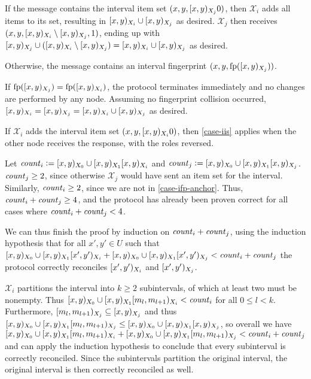 \begin{caselist}
 \label{case-iis}  If the message contains the interval item set $({x}, {y}, [{x},{y})_{X_j}{0})$, then $\mathcal{X}_i$ adds all items to its set, resulting in $[{x},{y})_{X_i} \cup [{x},{y})_{X_j}$ as desired. $\mathcal{X}_j$ then receives $({x}, {y}, {[{x},{y})_{X_i} \setminus [{x},{y})_{X_j}}, {1})$, ending up with $[{x},{y})_{X_j} \cup ([{x},{y})_{X_i} \setminus [{x},{y})_{X_j}) = [{x},{y})_{X_i} \cup [{x},{y})_{X_j}$ as desired.

 \label{case-ifp} Otherwise, the message contains an interval fingerprint $({x}, {y}, {\operatorname{fp}([{x},{y})_{X_j})})$.

\begin{caselist}
 If $\operatorname{fp}([{x},{y})_{X_j}) = \operatorname{fp}([{x},{y})_{X_i})$, the protocol terminates immediately and no changes are performed by any node. Assuming no fingerprint collision occurred, $[{x},{y})_{X_i} = [{x},{y})_{X_j} = [{x},{y})_{X_i} \cup [{x},{y})_{X_j}$ as desired.

 \label{case-ifp-anchor} If $\mathcal{X}_i$ adds the interval item set $({x}, {y}, [{x},{y})_{X_i}{0})$, then \cref{case-iis} applies when the other node receives the response, with the roles reversed.

\case[Recurse] Let $\mathit{count}_{i} \vcentcolon= [{x},{y})_{X_0} \cup [{x},{y})_{X_1}{[{x},{y})_{X_i}}$ and $\mathit{count}_{j} \vcentcolon= [{x},{y})_{X_0} \cup [{x},{y})_{X_1}{[{x},{y})_{X_j}}$. $\mathit{count}_{j} \geq 2$, since otherwise $\mathcal{X}_j$ would have sent an item set for the interval. Similarly, $\mathit{count}_{i} \geq 2$, since we are not in \cref{case-ifp-anchor}. Thus, $\mathit{count}_{i} + \mathit{count}_{j} \geq 4$, and the protocol has already been proven correct for all cases where $\mathit{count}_{i} + \mathit{count}_{j} < 4$. 

We can thus finish the proof by induction on $\mathit{count}_{i} + \mathit{count}_{j}$, using the induction hypothesis that for all $x', y' \in U$ such that $[{x},{y})_{X_0} \cup [{x},{y})_{X_1}{[{x'},{y'})_{X_i}} + [{x},{y})_{X_0} \cup [{x},{y})_{X_1}{[{x'},{y'})_{X_j}} < \mathit{count}_{i} + \mathit{count}_{j}$ the protocol correctly reconciles $[{x'},{y'})_{X_i}$ and $[{x'},{y'})_{X_j}$.

$\mathcal{X}_i$ partitions the interval into $k \geq 2$ subintervals, of which at least two must be nonempty.
Thus $[{x},{y})_{X_0} \cup [{x},{y})_{X_1}{[{m_l},{m_{l + 1}})_{X_i}} < \mathit{count}_{i}$ for all $0 \leq l < k$.
Furthermore, $[{m_l},{m_{l + 1}})_{X_j} \subseteq [{x},{y})_{X_j}$ and thus $[{x},{y})_{X_0} \cup [{x},{y})_{X_1}{[{m_l},{m_{l + 1}})_{X_j}} \leq [{x},{y})_{X_0} \cup [{x},{y})_{X_1}{[{x},{y})_{X_j}}$, so overall we have $[{x},{y})_{X_0} \cup [{x},{y})_{X_1}{[{m_l},{m_{l + 1}})_{X_i}} + [{x},{y})_{X_0} \cup [{x},{y})_{X_1}{[{m_l},{m_{l + 1}})_{X_j}} < \mathit{count}_{i} + \mathit{count}_{j}$ and can apply the induction hypothesis to conclude that every subinterval is correctly reconciled. Since the subintervals partition the original interval, the original interval is then correctly reconciled as well.
\end{caselist}
\end{caselist}

